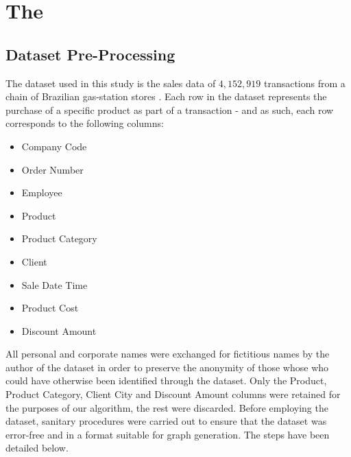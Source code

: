 
\chapter{The \algo}

\section{Dataset Pre-Processing}
The dataset used in this study is the sales data of $4,152,919$ transactions from a chain of Brazilian gas-station stores .
Each row in the dataset represents the purchase of a specific product as part of a transaction - and as such, each row corresponds to the following columns:
\begin{itemize}
\item Company Code
\item Order Number
\item Employee
\item Product
\item Product Category
\item Client
\item Sale Date Time
\item Product Cost
\item Discount Amount
\end{itemize}
All personal and corporate names were exchanged for fictitious names by the author of the dataset in order to preserve the anonymity of those whose who could have otherwise been identified through the dataset.
Only the Product, Product Category, Client City and Discount Amount columns were retained for the purposes of our algorithm, the rest were discarded.
Before employing the dataset, sanitary procedures were carried out to ensure that the dataset was error-free and in a format suitable for graph generation. The steps have been detailed below.

